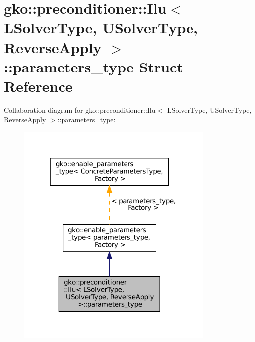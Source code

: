 \hypertarget{structgko_1_1preconditioner_1_1Ilu_1_1parameters__type}{}\section{gko\+:\+:preconditioner\+:\+:Ilu$<$ L\+Solver\+Type, U\+Solver\+Type, Reverse\+Apply $>$\+:\+:parameters\+\_\+type Struct Reference}
\label{structgko_1_1preconditioner_1_1Ilu_1_1parameters__type}


Collaboration diagram for gko\+:\+:preconditioner\+:\+:Ilu$<$ L\+Solver\+Type, U\+Solver\+Type, Reverse\+Apply $>$\+:\+:parameters\+\_\+type\+:
\nopagebreak
\begin{figure}[H]
\begin{center}
\leavevmode
\includegraphics[width=271pt]{structgko_1_1preconditioner_1_1Ilu_1_1parameters__type__coll__graph}
\end{center}
\end{figure}
